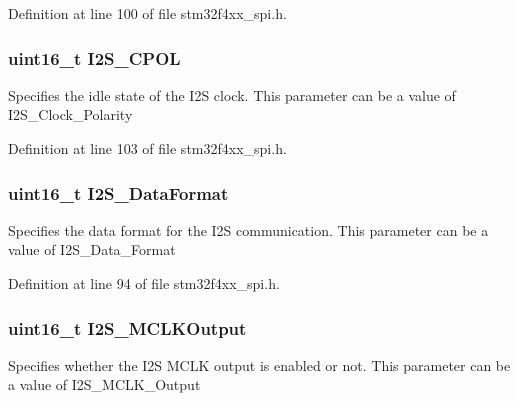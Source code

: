 Definition at line 100 of file stm32f4xx\-\_\-spi.\-h.

\hypertarget{struct_i2_s___init_type_def_a948d79d6388454da8459fea27c338900}{
\subsubsection[{I2\-S\-\_\-\-C\-P\-O\-L}]{\setlength{\rightskip}{0pt plus 5cm}uint16\-\_\-t I2\-S\-\_\-\-C\-P\-O\-L}}\label{struct_i2_s___init_type_def_a948d79d6388454da8459fea27c338900}
Specifies the idle state of the I2\-S clock. This parameter can be a value of I2\-S\-\_\-\-Clock\-\_\-\-Polarity 

Definition at line 103 of file stm32f4xx\-\_\-spi.\-h.

\hypertarget{struct_i2_s___init_type_def_a5d36bbd1f2aa29414ae1d25c3cc0d66c}{
\subsubsection[{I2\-S\-\_\-\-Data\-Format}]{\setlength{\rightskip}{0pt plus 5cm}uint16\-\_\-t I2\-S\-\_\-\-Data\-Format}}\label{struct_i2_s___init_type_def_a5d36bbd1f2aa29414ae1d25c3cc0d66c}
Specifies the data format for the I2\-S communication. This parameter can be a value of I2\-S\-\_\-\-Data\-\_\-\-Format 

Definition at line 94 of file stm32f4xx\-\_\-spi.\-h.

\hypertarget{struct_i2_s___init_type_def_a4e49b94b867428b8abf8e5385fb0879d}{
\subsubsection[{I2\-S\-\_\-\-M\-C\-L\-K\-Output}]{\setlength{\rightskip}{0pt plus 5cm}uint16\-\_\-t I2\-S\-\_\-\-M\-C\-L\-K\-Output}}\label{struct_i2_s___init_type_def_a4e49b94b867428b8abf8e5385fb0879d}
Specifies whether the I2\-S M\-C\-L\-K output is enabled or not. This parameter can be a value of I2\-S\-\_\-\-M\-C\-L\-K\-\_\-\-Output 

